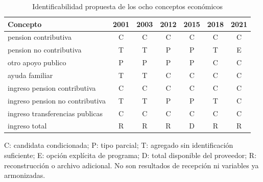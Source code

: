 \begin{table}[htbp]
\centering\small\singlespacing
\caption{Identificabilidad propuesta de los ocho conceptos económicos}\label{tab:pensiones_disponibilidad}
\begin{tabular}{p{5.1cm}cccccc}
\toprule \textbf{Concepto} & \textbf{2001} & \textbf{2003} & \textbf{2012} & \textbf{2015} & \textbf{2018} & \textbf{2021} \\
\midrule
pension contributiva & C & C & C & C & C & C \\
pension no contributiva & T & T & P & P & T & E \\
otro apoyo publico & P & P & P & P & C & C \\
ayuda familiar & T & T & C & C & C & C \\
ingreso pension contributiva & C & C & C & C & C & C \\
ingreso pension no contributiva & T & T & P & P & T & C \\
ingreso transferencias publicas & C & C & C & C & C & C \\
ingreso total & R & R & R & D & R & R \\
\bottomrule\end{tabular}
\par\medskip\begin{minipage}{\textwidth}\footnotesize
C: candidata condicionada; P: tipo parcial; T: agregado sin identificación suficiente; E: opción explícita de programa; D: total disponible del proveedor; R: reconstrucción o archivo adicional. No son resultados de recepción ni variables ya armonizadas.
\end{minipage}\end{table}
